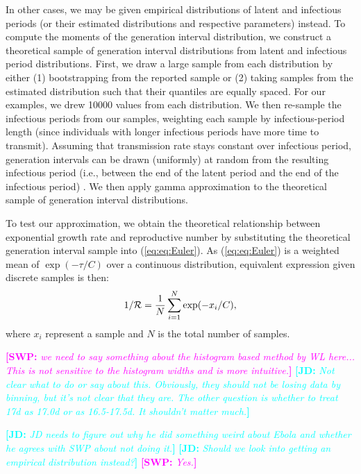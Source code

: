 \documentclass[12pt,]{article}
\newcommand{\RR}{\ensuremath{{\cal R}}}
\newcommand{\eref}[1]{(\ref{eq:#1})}
\newcommand{\fref}[1]{Fig.~\ref{fig:#1}}
\newcommand{\frange}[2]{Fig.~\ref{fig:#1}--\ref{fig:#2}}
\newcommand{\comment}[3]{\textcolor{#1}{\textbf{[#2: }\textit{#3}\textbf{]}}}
\newcommand{\jd}[1]{\comment{cyan}{JD}{#1}}
\newcommand{\swp}[1]{\comment{magenta}{SWP}{#1}}
\begin{document}
In other cases, we may be given empirical distributions of latent and infectious periods (or their estimated distributions and respective parameters) instead. 
To compute the moments of the generation interval distribution, we construct a theoretical sample of generation interval distributions from latent and infectious period distributions. 
First, we draw a large sample from each distribution by either (1) bootstrapping from the reported sample or (2) taking samples from the estimated distribution such that their quantiles are equally spaced. 
For our examples, we drew 10000 values from each distribution. 
We then re-sample the infectious periods from our samples, weighting each sample by infectious-period length (since individuals with longer infectious periods have more time to transmit).
Assuming that transmission rate stays constant over infectious period, generation intervals can be drawn (uniformly) at random from the resulting infectious period (i.e., between the end of the latent period and the end of the infectious period) \cite{HampDush09}.
We then apply gamma approximation to the theoretical sample of generation interval distributions.

To test our approximation, we obtain the theoretical relationship between exponential growth rate and reproductive number by substituting the theoretical generation interval sample into \eref{eq:Euler}. As \eref{eq:Euler} is a weighted mean of $\exp(-\tau/C)$ over a continuous distribution, equivalent expression given discrete samples is then:
\begin{equation}
1/\RR = \frac{1}{N} \sum_{i=1}^{N} \exp(-x_i/C),
\label{eq:obsR}
\end{equation}
where $x_i$ represent a sample and $N$ is the total number of samples.

\swp{we need to say something about the histogram based method by WL here... This is not sensitive to the histogram widths and is more intuitive.}
\jd{Not clear what to do or say about this. Obviously, they should not be losing data by binning, but it's not clear that they are. The other question is whether to treat 17d as 17.0d or as 16.5-17.5d. It shouldn't matter much.}

\jd{JD needs to figure out why he did something weird about Ebola and whether he agrees with SWP about not doing it.}
\jd{Should we look into getting an empirical distribution instead?}
\swp{Yes.}

\end{document}
